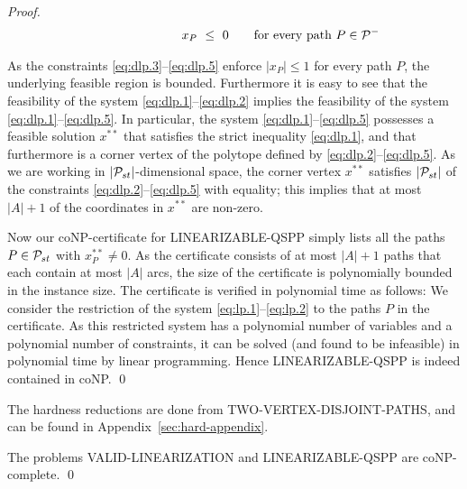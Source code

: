 \documentclass[runningheads]{llncs}
\begin{document}
\begin{proof}
\begin{align}
                x_P  ~\le~0 &\qquad\text{for every path $P\in\pppy$} \label{eq:dlp.5} \\[-2.5ex] 
\hphantom{\sum_{P\in\ppp} \qspp(P,q)\cdot x_P~<~0} &&                \nonumber
\end{align}
As the constraints \eqref{eq:dlp.3}--\eqref{eq:dlp.5} enforce $|x_P|\le1$ for every path $P$, 
the underlying feasible region is bounded.
Furthermore it is easy to see that the feasibility of the system \eqref{eq:dlp.1}--\eqref{eq:dlp.2} 
implies the feasibility of the system \eqref{eq:dlp.1}--\eqref{eq:dlp.5}.
In particular, the system \eqref{eq:dlp.1}--\eqref{eq:dlp.5} possesses a feasible solution $x^{**}$ 
that satisfies the strict inequality \eqref{eq:dlp.1}, and 
that furthermore is a corner vertex of the polytope defined by \eqref{eq:dlp.2}--\eqref{eq:dlp.5}.
As we are working in $|{\cal P}_{st}|$-dimensional space, the corner vertex $x^{**}$ satisfies $|{\cal P}_{st}|$ of 
the constraints \eqref{eq:dlp.2}--\eqref{eq:dlp.5} with equality; this implies that at most $|A|+1$ 
of the coordinates in $x^{**}$ are non-zero.

Now our coNP-certificate for LINEARIZABLE-QSPP simply lists all the paths $P\in{\cal P}_{st}$ with $x^{**}_P\ne0$.
As the certificate consists of at most $|A|+1$ paths that each contain at most $|A|$ arcs, the
size of the certificate is polynomially bounded in the instance size.
The certificate is verified in polynomial time as follows:
We consider the restriction of the system \eqref{eq:lp.1}--\eqref{eq:lp.2} to the paths $P$ 
in the certificate.
As this restricted system has a polynomial number of variables and a polynomial number of constraints,
it can be solved (and found to be infeasible) in polynomial time by linear programming.
Hence LINEARIZABLE-QSPP is indeed contained in coNP.
\qed
\end{proof}

The hardness reductions are done from TWO-VERTEX-DISJOINT-PATHS, and
can be found in Appendix~\ref{sec:hard-appendix}.
\begin{theorem}
\label{th:hard}
The problems VALID-LINEARIZATION and LINEARIZABLE-QSPP are coNP-complete.
\qed
\end{theorem}
\end{document}

